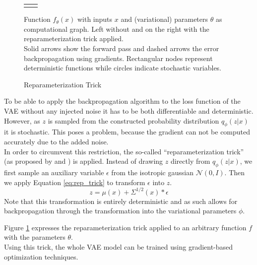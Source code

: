 \begin{figure}
  \centering
  \begin{tabular}{c:c}
      \quad \quad
    &
      \quad

    \\
  \end{tabular}
  \caption{Reparameterization Trick}
  \label{fig:rep_trick}
  \medskip
  \small
  Function $f_\theta(x)$ with inputs $x$ and (variational) parameters $\theta$ as computational graph.
  Left without and on the right with the reparameterization trick applied.\\
  Solid arrows show the forward pass and dashed arrows the error backpropagation using gradients.
  Rectangular nodes represent deterministic functions while circles indicate stochastic variables.
\end{figure}

To be able to apply the backpropagation\cite{backprop:1988} algorithm to the loss function of the VAE without any injected noise it has to be both differentiable and deterministic.
However, as $z$ is sampled from the constructed probability distribution $q_\phi(z|x)$ it is stochastic.
This poses a problem, because the gradient can not be computed accurately due to the added noise.\\
In order to circumvent this restriction, the so-called ``reparameterization trick'' (as proposed by \cite{vae:2014} and \cite{dlgm:2014}) is applied.
Instead of drawing $z$ directly from $q_\phi(z|x)$, we first sample an auxiliary variable $\epsilon$ from the isotropic gaussian $\mathcal{N}(0, I)$. Then we apply Equation \ref{eq:rep_trick} to transform $\epsilon$ into $z$.
\begin{equation}
  \label{eq:rep_trick}
  z = \mu(x) + \Sigma^{1/2}(x)*\epsilon
\end{equation}
Note that this transformation is entirely deterministic and as such allows for backpropagation through the transformation into the variational parameters $\phi$.

Figure \ref{fig:rep_trick} expresses the reparameterization trick applied to an arbitrary function $f$ with the parameters $\theta$.\\
Using this trick, the whole VAE model can be trained using gradient-based optimization techniques.\\\\

